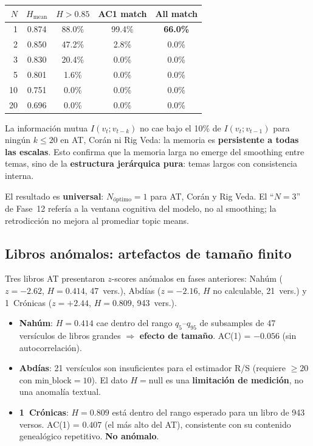 \documentclass[12pt,a4paper]{article}
\begin{document}
\begin{center}\small
\begin{tabular}{rcccc}
\toprule
\textbf{$N$} & \textbf{$H_{\text{mean}}$} & \textbf{$H > 0.85$} & \textbf{AC1 match} & \textbf{All match} \\
\midrule
1  & 0.874 & 88.0\% & 99.4\% & \textbf{66.0\%} \\
2  & 0.850 & 47.2\% &  2.8\% &  0.0\% \\
3  & 0.830 & 20.4\% &  0.0\% &  0.0\% \\
5  & 0.801 &  1.6\% &  0.0\% &  0.0\% \\
10 & 0.751 &  0.0\% &  0.0\% &  0.0\% \\
20 & 0.696 &  0.0\% &  0.0\% &  0.0\% \\
\bottomrule
\end{tabular}
\end{center}

La informaci\'on mutua $I(v_t; v_{t-k})$ no cae bajo el 10\% de $I(v_t; v_{t-1})$
para ning\'un $k \leq 20$ en AT, Cor\'an ni Rig Veda: la memoria es
\textbf{persistente a todas las escalas}. Esto confirma que la memoria larga
no emerge del smoothing entre temas, sino de la \textbf{estructura jer\'arquica
pura}: temas largos con consistencia interna.

El resultado es \textbf{universal}: $N_{\text{\'optimo}} = 1$ para AT, Cor\'an
y Rig Veda. El ``$N = 3$'' de Fase~12 refer\'ia a la ventana cognitiva del modelo,
no al smoothing; la retrodicci\'on no mejora al promediar topic means.

\subsection{Libros an\'omalos: artefactos de tama\~no finito}

Tres libros AT presentaron $z$-scores an\'omalos en fases anteriores:
Nah\'um ($z = -2.62$, $H = 0.414$, 47~vers.), Abd\'ias ($z = -2.16$, $H$
no calculable, 21~vers.) y 1~Cr\'onicas ($z = +2.44$, $H = 0.809$, 943~vers.).

\begin{itemize}[leftmargin=2em]
\item \textbf{Nah\'um}: $H = 0.414$ cae dentro del rango $q_{5}$--$q_{95}$
      de subsamples de 47 vers\'iculos de libros grandes $\Rightarrow$
      \textbf{efecto de tama\~no}. AC(1) = $-0.056$ (sin autocorrelaci\'on).
\item \textbf{Abd\'ias}: 21 vers\'iculos son insuficientes para el estimador R/S
      (requiere $\geq 20$ con $\text{min\_block} = 10$). El dato $H = \text{null}$
      es una \textbf{limitaci\'on de medici\'on}, no una anomal\'ia textual.
\item \textbf{1~Cr\'onicas}: $H = 0.809$ est\'a dentro del rango esperado para
      un libro de 943 versos. AC(1) = $0.407$ (el m\'as alto del AT), consistente
      con su contenido geneal\'ogico repetitivo. \textbf{No an\'omalo}.
\end{itemize}
\end{document}
